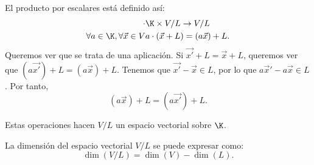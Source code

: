 El producto por escalares está definido así:
\[
\begin{split}
	\cdot & \K \times V/L \to V/L \\
	    \forall a \in \K, \forall \vec{x} \in V  & a \cdot \left(\vec{x} + L\right) = \left(a\vec{x}\right)+ L.
\end{split}
\]
Queremos ver que se trata de una aplicación. Si $\displaystyle \vec{x'}+L = \vec{x}+L $, queremos ver que $\displaystyle \left(a\vec{x'} \right)+ L = \left(a\vec{x} \right)+ L $. Tenemos que $\displaystyle \vec{x'} - \vec{x} \in L $, por lo que $\displaystyle a\vec{x}'-a\vec{x} \in L $. Por tanto, 
\[\left(a\vec{x}\right)+ L = \left(a\vec{x'}\right)+L .\]

\begin{observation}
\normalfont Estas operaciones hacen $\displaystyle V/L $ un espacio vectorial sobre $\displaystyle \K $.
\end{observation}

\begin{ftheorem}[]
\normalfont La dimensión del espacio vectorial $\displaystyle V/L $ se puede expresar como:
\[ \dim\left(V/L\right) = \dim\left(V\right) - \dim\left(L\right) .\]
\end{ftheorem}

